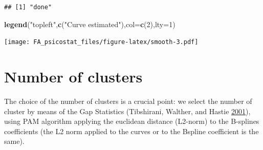 \documentclass[]{article}
\newenvironment{Shaded}{\begin{snugshade}}{\end{snugshade}}
\newcommand{\CommentTok}[1]{\textcolor[rgb]{0.56,0.35,0.01}{\textit{#1}}}
\newcommand{\DataTypeTok}[1]{\textcolor[rgb]{0.13,0.29,0.53}{#1}}
\newcommand{\DecValTok}[1]{\textcolor[rgb]{0.00,0.00,0.81}{#1}}
\newcommand{\KeywordTok}[1]{\textcolor[rgb]{0.13,0.29,0.53}{\textbf{#1}}}
\newcommand{\NormalTok}[1]{#1}
\newcommand{\OperatorTok}[1]{\textcolor[rgb]{0.81,0.36,0.00}{\textbf{#1}}}
\newcommand{\OtherTok}[1]{\textcolor[rgb]{0.56,0.35,0.01}{#1}}
\newcommand{\StringTok}[1]{\textcolor[rgb]{0.31,0.60,0.02}{#1}}
\begin{document}
\begin{Shaded}
\end{Shaded}

\begin{verbatim}
## [1] "done"
\end{verbatim}

\begin{Shaded}
\begin{Highlighting}[]
\KeywordTok{legend}\NormalTok{(}\StringTok{"topleft"}\NormalTok{,}\KeywordTok{c}\NormalTok{(}\StringTok{"Curve estimated"}\NormalTok{),}\DataTypeTok{col=}\KeywordTok{c}\NormalTok{(}\DecValTok{2}\NormalTok{),}\DataTypeTok{lty=}\DecValTok{1}\NormalTok{)}
\end{Highlighting}
\end{Shaded}

\texttt{[image: FA\_psicostat\_files/figure-latex/smooth-3.pdf]}

\section{Number of clusters}

The choice of the number of clusters is a crucial point: we select the
number of cluster by means of the Gap Statistics (Tibshirani, Walther,
and Hastie \protect\hyperlink{ref-tibshirani2001estimating}{2001}),
using PAM algorithm applying the euclidean distance (L2-norm) to the
B-splines coefficients (the L2 norm applied to the curves or to the
Bspline coefficient is the same).
\end{document}
